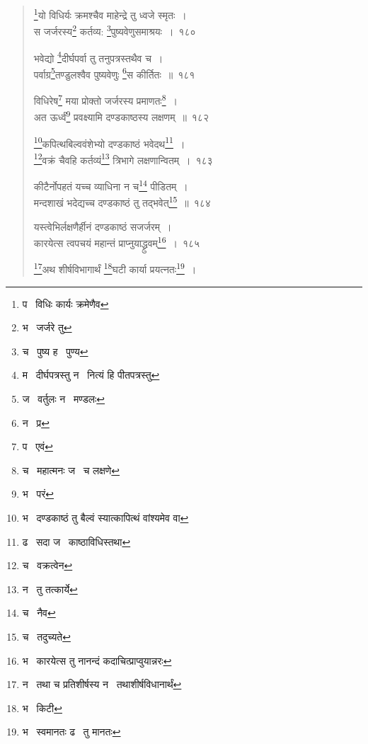 \documentclass[11pt, openany]{book}
\begin{document}

\newpage
\lfoot{}

\begin{quote}
{\na \renewcommand{\thefootnote}{1}\footnote{प \textendash\ विधिः कार्यः क्रमेणैव}यो विधिर्यः क्रमश्चैव माहेन्द्रे तु ध्वजे स्मृतः~।\\
स जर्जरस्य\renewcommand{\thefootnote}{2}\footnote{भ \textendash\ जर्जरे तु} कर्तव्य: \renewcommand{\thefootnote}{3}\footnote{च \textendash\ पुष्य ह \textendash\ पुण्य}पुष्यवेणुसमाश्रयः~।~१८०

भवेद्यो \renewcommand{\thefootnote}{4}\footnote{म \textendash\ दीर्घपत्रस्तु न \textendash\ नित्यं हि पीतपत्रस्तु}दीर्घपर्वा तु तनुपत्रस्तथैव च~।\\
पर्वाग्र\renewcommand{\thefootnote}{5}\footnote{ज \textendash\ वर्तुलः न \textendash\ मण्डलः}तण्डुलश्वैव पुष्यवेणुः \renewcommand{\thefootnote}{6}\footnote{न \textendash\ प्र}स कीर्तितः~॥~१८१

विधिरेष\renewcommand{\thefootnote}{7}\footnote{प \textendash\ एवं} मया प्रोक्तो जर्जरस्य प्रमाणतः\renewcommand{\thefootnote}{8}\footnote{च \textendash\ महात्मनः ज \textendash\ च लक्षणे}~।\\
अत ऊर्ध्वं\renewcommand{\thefootnote}{9}\footnote{भ \textendash\ परं} प्रवक्ष्यामि दण्डकाष्ठस्य लक्षणम्~॥~१८२

\renewcommand{\thefootnote}{10}\footnote{भ \textendash\ दण्डकाष्ठं तु बैल्वं स्यात्कापित्थं वांश्यमेव वा}कपित्थबिल्ववंशेभ्यो दण्डकाष्ठं भवेदथ\renewcommand{\thefootnote}{11}\footnote{ढ \textendash\ सदा ज \textendash\ काष्ठाविधिस्तथा}~।\\
\renewcommand{\thefootnote}{12}\footnote{च \textendash\ वक्रत्वेन}वक्रं चैवहि कर्तव्यं\renewcommand{\thefootnote}{13}\footnote{न \textendash\ तु तत्कार्ये} त्रिभागे लक्षणान्वितम्~।~१८३

कीटैर्नोपहतं यच्च व्याधिना न च\renewcommand{\thefootnote}{14}\footnote{च \textendash\ नैव} पीडितम्~।\\
मन्दशाखं भदेद्यच्च दण्डकाष्ठं तु तद्भवेत्\renewcommand{\thefootnote}{15}\footnote{च \textendash\ तदुच्यते}~॥~१८४

यस्त्वेभिर्लक्षणैर्हीनं दण्डकाष्ठं सजर्जरम्~।\\
कारयेत्स त्वपचयं महान्तं प्राप्नुयाद्ध्रुवम्\renewcommand{\thefootnote}{16}\footnote{भ \textendash\ कारयेत्स तु नानन्दं कदाचित्प्राप्वुयान्नरः}~।~१८५

\renewcommand{\thefootnote}{17}\footnote{न \textendash\ तथा च प्रतिशीर्षस्य न \textendash\ तथाशीर्षविधानार्थं}अथ शीर्षविभागार्थं \renewcommand{\thefootnote}{18}\footnote{भ \textendash\ किटी}घटी कार्या प्रयत्नतः\renewcommand{\thefootnote}{19}\footnote{भ \textendash\ स्वमानतः ढ \textendash\ तु मानतः}~।}
\end{quote}
\end{document}
